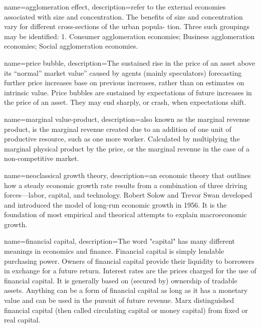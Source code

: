{
name=agglomeration effect,
description={refer to the external economies associated with size and concentration. The benefits of size and concentration vary for different cross-sections of the urban popula- tion. Three such groupings may be identified: 1. Consumer agglomeration economies; Business agglomeration economies; Social agglomeration economies.\cite{carlinoAgglomerationEconomiesSurvey1978}}
}

{
name=price bubble,
description={The sustained rise in the price of an asset above its ``normal'' market value'' caused by agents (mainly speculators) forecasting further price increases base on previous increases, rather than on estimates on intrinsic value.  Price bubbles are sustained by expectations of future increases in the price of an asset. They may end sharply, or crash, when expectations shift.}
}

{
name=marginal value-product,
description={also known as the marginal revenue product, is the marginal revenue created due to an addition of one unit of productive resource, such as one more worker. Calculated by multiplying the marginal physical product by the price, or the marginal revenue in the case of a non-competitive market. }
}


{
name=neoclassical growth theory,
description={an economic theory that outlines how a steady economic growth rate results from a combination of three driving forces—labor, capital, and technology. Robert Solow and Trevor Swan developed and introduced the model of long-run economic growth in 1956. It is the  foundation of most empirical and theorical attempts to explain macroeconomic growth.}
}

{
name=financial capital,
description={The word "capital" has many different meanings in economics and finance. Financial capital is simply lendable purchasing power. Owners of financial capital provide their liquidity to borrowers in exchange for a future return. Interest rates are the prices charged for the use of financial capital. It is generally based on (secured by) ownership of tradable assets.  Anything can be a form of financial capital as long as it has a monetary value and can be  used in the pursuit of future revenue. Marx distinguished  financial capital (then called circulating capital or money capital) from fixed or real capital.   }
}


